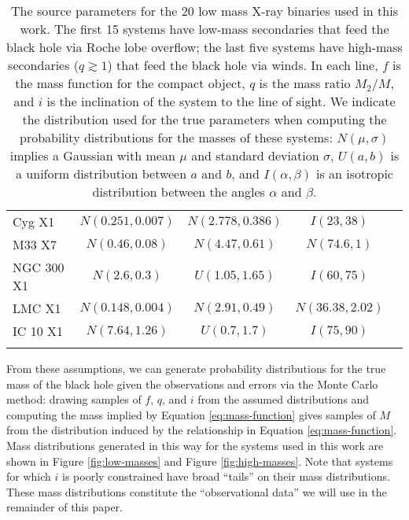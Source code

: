 \documentclass[preprint]{aastex}
\begin{document}
\begin{table}
\begin{center}
\begin{tabular}{|l|c|c|c|l|}
      Cyg X1 & $N(0.251, 0.007)$ & $N(2.778, 0.386)$ & $I(23, 38)$ &
      \citet{Gies2003} \\ 
      M33 X7 & $N(0.46, 0.08)$ & $N(4.47, 0.61)$ & $N(74.6, 1)$ &
      \citet{Orosz2007} \\
      NGC 300 X1 & $N(2.6, 0.3)$ & $U(1.05, 1.65)$ & $I(60, 75)$ &
      \citet{Crowther2010} \\
      LMC X1 & $N(0.148, 0.004)$ & $N(2.91, 0.49)$ & $N(36.38, 2.02)$
      & \citet{Orosz2009} \\
      IC 10 X1 & $N(7.64, 1.26)$ & $U(0.7, 1.7)$ & $I(75, 90)$ & 
      \citet{Prestwich2007} \\
       & & & & \citet{Silverman2008} \\
       \hline
    \end{tabular}
  \end{center}
  \caption{\label{tab:sources} The source parameters for the 20 low
    mass X-ray binaries used in this work.  The first 15 systems have
    low-mass secondaries that feed the black hole via Roche lobe
    overflow; the last five systems have high-mass secondaries ($q
    \gtrsim 1$) that feed the black hole via winds.  In each line, $f$
    is the mass function for
    the compact object, $q$ is the mass ratio $M_2/M$, and $i$ is the
    inclination of the system to the line of sight.  We indicate the
    distribution used for the true parameters when computing the
    probability distributions for the masses of these systems:
    $N(\mu,\sigma)$ implies a Gaussian with mean $\mu$ and standard
    deviation $\sigma$, $U(a,b)$ is a uniform distribution between $a$ and
    $b$, and $I(\alpha,\beta)$ is an isotropic distribution between the
    angles $\alpha$ and $\beta$.}
\end{table}

From these assumptions, we can generate probability distributions for
the true mass of the black hole given the observations and errors via
the Monte Carlo method: drawing samples of $f$, $q$, and $i$ from the
assumed distributions and computing the mass implied by Equation
\eqref{eq:mass-function} gives samples of $M$ from the distribution
induced by the relationship in Equation \eqref{eq:mass-function}.
Mass distributions generated in this way for the systems used in this
work are shown in Figure \ref{fig:low-masses} and Figure
\ref{fig:high-masses}.  Note that systems for which $i$ is poorly
constrained have broad ``tails'' on their mass distributions.  These
mass distributions constitute the ``observational data'' we will use
in the remainder of this paper.
\end{document}
